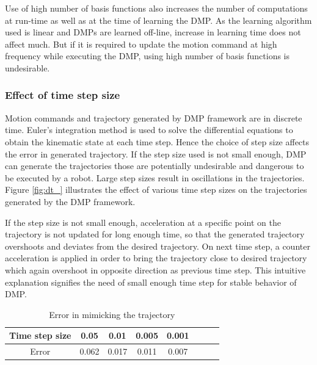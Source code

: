 Use of high number of basis functions also increases the number of computations at run-time as well as at the time of learning the DMP. As the learning algorithm used is linear and DMPs are learned off-line, increase in learning time does not affect much. But if it is required to update the motion command at high frequency while executing the DMP, using high number of basis functions is undesirable.     

\subsubsection{Effect of time step size}   
Motion commands and trajectory generated by DMP framework are in discrete time. Euler's integration method is used to solve the differential equations to obtain the kinematic state at each time step. Hence the choice of step size affects the error in generated trajectory. If the step size used is not small enough, DMP can generate the trajectories those are potentially undesirable and dangerous to be executed by a robot. Large step sizes result in oscillations in the trajectories. Figure \ref{fig:dt_} illustrates the effect of various time step sizes on the trajectories generated by the DMP framework. 

If the step size is not small enough, acceleration at a specific point on the trajectory is not updated for long enough time, so that the generated trajectory overshoots and deviates from the desired trajectory. On next time step, a counter acceleration is applied in order to bring the trajectory close to desired trajectory which again overshoot in opposite direction as previous time step. This intuitive explanation signifies the need of small enough time step for stable behavior of DMP.   


\begin{center}
	\begin{table}[H]
		\centering
		\begin{tabular}{| c | c | c | c | c | c | c | c |}	
			\hline
			Time step size & 0.05 & 0.01 & 0.005 & 0.001 \\       
			\hline
			Error & 0.062 & 0.017 & 0.011 & 0.007 \\
			\hline
		\end{tabular}
		\caption{Error in mimicking the trajectory}
	\end{table}\label{_dt_e}
\end{center}


